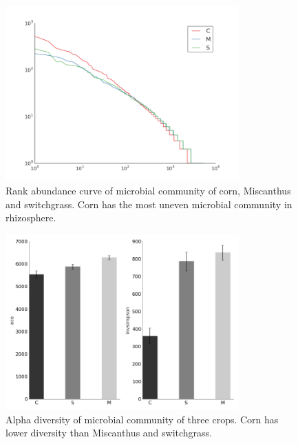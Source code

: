 \documentclass[12pt]{article}
\begin{document}
{    \begin{figure}[tbph!]
    \centering
    \includegraphics[width=0.8\textwidth]{figures/otu.rankabuncurve}
    \caption[Rank abundance curve]{Rank abundance curve of microbial community of corn, Miscanthus and switchgrass. Corn has the most uneven microbial community in rhizosphere.}
    \label{fig:otu.rankabuncurve}
    \end{figure}


    \begin{figure}[tbph!]
    \centering
    \includegraphics[width=0.8\textwidth]{figures/otu.alpha.div}
    \caption[Alpha diversity]{Alpha diversity of microbial community of three crops. Corn has lower diversity than Miscanthus and switchgrass.}
    \label{fig:otu.alpha.div}
    \end{figure}



}
\end{document}
